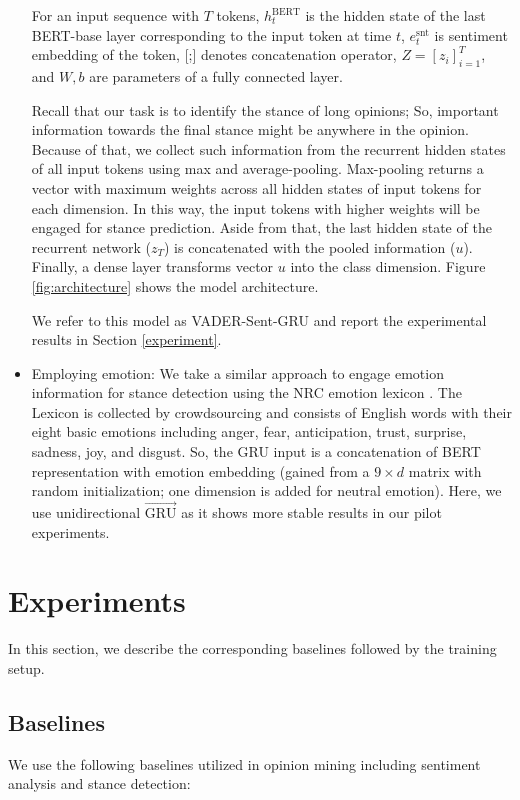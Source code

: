 \documentclass[11pt,a4paper]{article}
\begin{document}
\begin{itemize}
    For an input sequence with $T$ tokens, $h_{t}^{\text{BERT}}$ is the hidden state of the last  BERT-base layer corresponding to the input token at time  $t$, $e_t^{\text{snt}}$ is sentiment embedding of the token, [;] denotes concatenation operator, $Z=[z_i]_{i=1}^T$, and $W,b$ are parameters of a fully connected layer.
    
    Recall that our task is to identify the stance of long opinions; So, important information towards the final stance might be anywhere in the opinion. Because of that, we collect such information from the recurrent hidden states of all input tokens using max and average-pooling. Max-pooling returns a vector with maximum weights across all hidden states of input tokens for each dimension. In this way, the input tokens with higher weights will be engaged for stance prediction. Aside from that, the last hidden state of the recurrent network ($z_T$) is concatenated with the pooled information ($u$). Finally, a dense layer transforms vector $u$ into the class dimension. Figure \ref{fig:architecture} shows the model architecture.

    We refer to this model as VADER-Sent-GRU and report the experimental results in Section \ref{experiment}.
    
    \item Employing emotion: We take a similar approach to engage emotion information for stance detection using the NRC emotion lexicon \cite{Mohammad13}.  The Lexicon is collected by crowdsourcing and consists of English words with their eight basic emotions including anger, fear, anticipation, trust, surprise, sadness, joy, and disgust. So, the
    GRU input is a concatenation of BERT representation with emotion embedding (gained from a $9\times d$ matrix with random initialization; one dimension is added for neutral emotion). Here, we use unidirectional $\overrightarrow{\text{GRU}}$ as it shows more stable results in our pilot experiments.
    \end{itemize}
    






\section{Experiments}
In this section, we describe the corresponding  baselines  followed by the training setup.
\subsection{Baselines}
We use the following baselines utilized in opinion mining including sentiment analysis and stance detection: 
\end{document}
